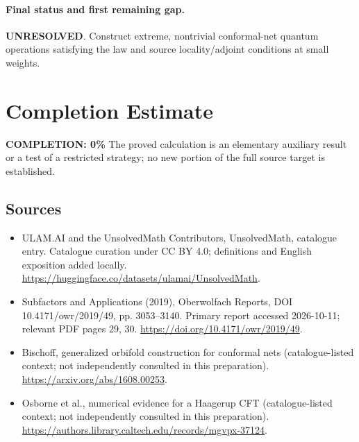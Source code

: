 \documentclass[11pt]{article}
\begin{document}
\paragraph{Final status and first remaining gap.}
\textbf{UNRESOLVED}. Construct extreme, nontrivial conformal-net quantum operations satisfying the law and source locality/adjoint conditions at small weights.

\section{Completion Estimate}
\noindent\textbf{COMPLETION: 0\%}
The proved calculation is an elementary auxiliary result or a test of a restricted strategy; no new portion of the full source target is established.

\subsection{Sources}
\begin{itemize}
\item[\hypertarget{source:statement:1}{S1}] ULAM.AI and the UnsolvedMath Contributors, UnsolvedMath, catalogue entry. Catalogue curation under CC BY 4.0; definitions and English exposition added locally.
\url{https://huggingface.co/datasets/ulamai/UnsolvedMath}.
\item[\hypertarget{source:statement:2}{S2}] Subfactors and Applications (2019), Oberwolfach Reports, DOI 10.4171/owr/2019/49, pp. 3053--3140. Primary report accessed 2026-10-11; relevant PDF pages 29, 30.
\url{https://doi.org/10.4171/owr/2019/49}.
\item[\hypertarget{source:statement:3}{S3}] Bischoff, generalized orbifold construction for conformal nets (catalogue-listed context; not independently consulted in this preparation).
\url{https://arxiv.org/abs/1608.00253}.
\item[\hypertarget{source:statement:4}{S4}] Osborne et al., numerical evidence for a Haagerup CFT (catalogue-listed context; not independently consulted in this preparation).
\url{https://authors.library.caltech.edu/records/mgvpx-37124}.
\end{itemize}
\label{end:statement}
\end{document}
